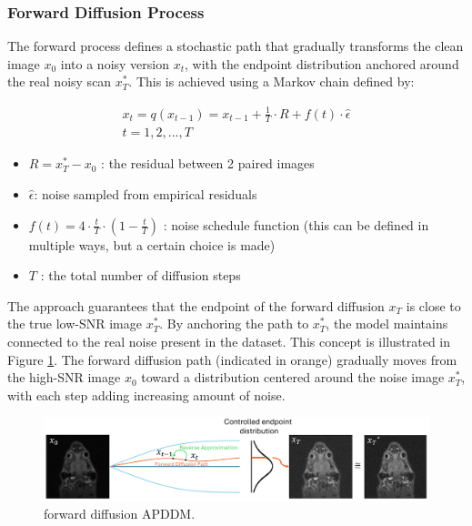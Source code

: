 \documentclass[twocolumn]{article}
\begin{document}
\subsubsection{Forward Diffusion Process}
The forward process defines a stochastic path that gradually transforms the clean image $x_0$ into a noisy version $x_t$, with the endpoint distribution anchored around the real noisy scan $x_T^*$. 
This is achieved using a Markov chain defined by:

\begin{equation}\label{eq:Markov chain}
\begin{split}
x_t=q(x_{t-1})=x_{t-1}+\frac{1}{T}\cdot R+f(t)\cdot \hat{\epsilon}\\
t=1,2,...,T
\end{split}
\end{equation}

\begin{itemize}
    \item $R=x_T^*-x_0$ : the residual between 2 paired images
    \item $\hat{\epsilon} $: noise sampled from empirical residuals
    \item $f(t)=4 \cdot \frac{t}{T} \cdot (1-\frac{t}{T})$ : noise schedule function (this can be defined in multiple ways, but a certain choice is made)
    \item $T$ : the total number of diffusion steps
\end{itemize}


The approach guarantees that the endpoint of the forward diffusion $x_T$ is close to the true low-SNR image $x_T^*$. 
By anchoring the path to $x_T^*$, the model maintains connected to the real noise present in the dataset. 
This concept is illustrated in Figure \ref{fig:forward APDDM}. The forward diffusion path (indicated in orange) gradually moves from the high-SNR image $x_0$ toward a distribution centered around the noise image $x_T^*$, with each step adding increasing amount of noise. 


\begin{figure}[H]
    \centering
    \includegraphics[width=1\linewidth]{forward APDDM.png}
    \caption{forward diffusion APDDM.}
    \label{fig:forward APDDM}
\end{figure}
\end{document}
